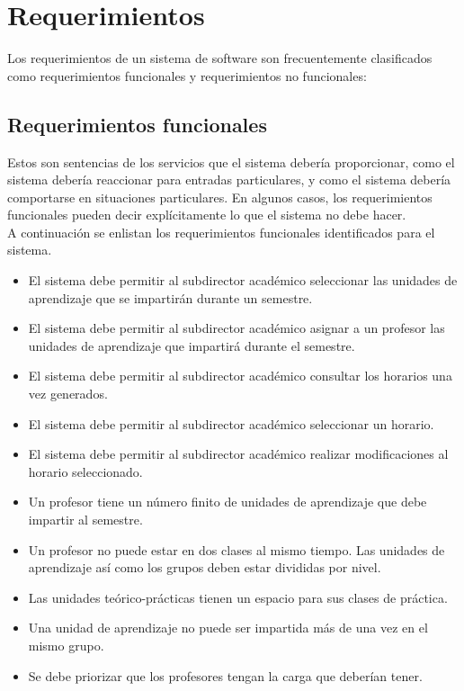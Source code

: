 \section{Requerimientos}

	Los requerimientos de un sistema de software son frecuentemente clasificados como requerimientos funcionales y requerimientos no funcionales: 

\subsection{Requerimientos funcionales}

	Estos son sentencias de los servicios que el sistema debería proporcionar, como el sistema debería reaccionar para entradas particulares, y como el sistema debería comportarse en situaciones particulares. En algunos casos, los requerimientos funcionales pueden decir explícitamente lo que el sistema no debe hacer. \\
	
	A continuación se enlistan los requerimientos funcionales identificados para el sistema.	
	
	\begin{itemize}
		\item El sistema debe permitir al subdirector académico seleccionar las unidades de aprendizaje que se impartirán durante un semestre.
		
		\item El sistema debe permitir al subdirector académico asignar a un profesor las unidades de aprendizaje que impartirá durante el semestre.
		
		\item El sistema debe permitir al subdirector académico consultar los horarios una vez generados.
		
		\item El sistema debe permitir al subdirector académico seleccionar un horario.
		
		\item El sistema debe permitir al subdirector académico realizar modificaciones al horario seleccionado.
		
		\item Un profesor tiene un número finito de unidades de aprendizaje que debe impartir al semestre.
		
		\item Un profesor no puede estar en dos clases al mismo tiempo.
		Las unidades de aprendizaje así como los grupos deben estar divididas por nivel.
		
		\item Las unidades teórico-prácticas tienen un espacio para sus clases de práctica.
		
		\item Una unidad de aprendizaje no puede ser impartida más de una vez en el mismo grupo.
		
		\item Se debe priorizar que los profesores tengan la carga que deberían tener.
		
	\end{itemize}
	

